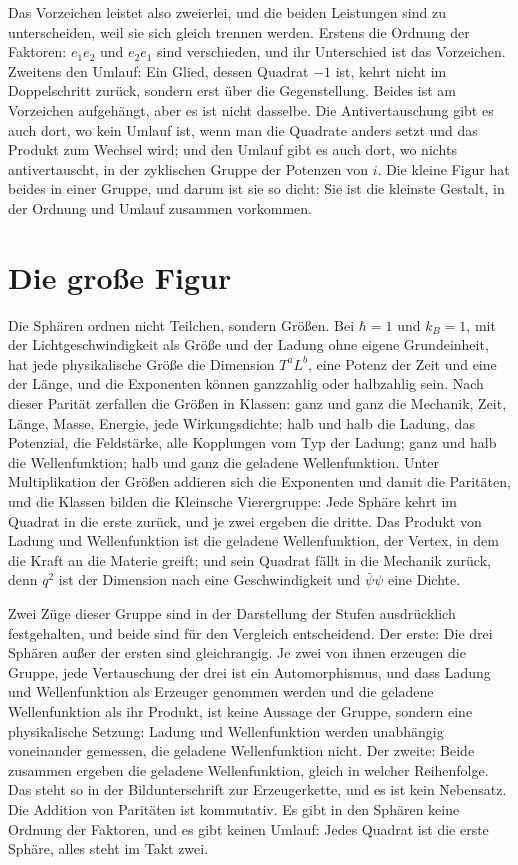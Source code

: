 \documentclass[11pt,a4paper]{article}
\begin{document}
Das Vorzeichen leistet also zweierlei, und die beiden Leistungen sind zu unterscheiden, weil sie sich gleich trennen werden. Erstens die Ordnung der Faktoren: $e_1e_2$ und $e_2e_1$ sind verschieden, und ihr Unterschied ist das Vorzeichen. Zweitens den Umlauf: Ein Glied, dessen Quadrat $-1$ ist, kehrt nicht im Doppelschritt zurück, sondern erst über die Gegenstellung. Beides ist am Vorzeichen aufgehängt, aber es ist nicht dasselbe. Die Antivertauschung gibt es auch dort, wo kein Umlauf ist, wenn man die Quadrate anders setzt und das Produkt zum Wechsel wird; und den Umlauf gibt es auch dort, wo nichts antivertauscht, in der zyklischen Gruppe der Potenzen von $i$. Die kleine Figur hat beides in einer Gruppe, und darum ist sie so dicht: Sie ist die kleinste Gestalt, in der Ordnung und Umlauf zusammen vorkommen.

\section{Die große Figur}
\label{sec:gross}

Die Sphären ordnen nicht Teilchen, sondern Größen. Bei $\hbar=1$ und $k_B=1$, mit der Lichtgeschwindigkeit als Größe und der Ladung ohne eigene Grundeinheit, hat jede physikalische Größe die Dimension $T^aL^b$, eine Potenz der Zeit und eine der Länge, und die Exponenten können ganzzahlig oder halbzahlig sein. Nach dieser Parität zerfallen die Größen in Klassen: ganz und ganz die Mechanik, Zeit, Länge, Masse, Energie, jede Wirkungsdichte; halb und halb die Ladung, das Potenzial, die Feldstärke, alle Kopplungen vom Typ der Ladung; ganz und halb die Wellenfunktion; halb und ganz die geladene Wellenfunktion. Unter Multiplikation der Größen addieren sich die Exponenten und damit die Paritäten, und die Klassen bilden die Kleinsche Vierergruppe: Jede Sphäre kehrt im Quadrat in die erste zurück, und je zwei ergeben die dritte. Das Produkt von Ladung und Wellenfunktion ist die geladene Wellenfunktion, der Vertex, in dem die Kraft an die Materie greift; und sein Quadrat fällt in die Mechanik zurück, denn $q^2$ ist der Dimension nach eine Geschwindigkeit und $\bar\psi\psi$ eine Dichte.

Zwei Züge dieser Gruppe sind in der Darstellung der Stufen ausdrücklich festgehalten, und beide sind für den Vergleich entscheidend. Der erste: Die drei Sphären außer der ersten sind gleichrangig. Je zwei von ihnen erzeugen die Gruppe, jede Vertauschung der drei ist ein Automorphismus, und dass Ladung und Wellenfunktion als Erzeuger genommen werden und die geladene Wellenfunktion als ihr Produkt, ist keine Aussage der Gruppe, sondern eine physikalische Setzung: Ladung und Wellenfunktion werden unabhängig voneinander gemessen, die geladene Wellenfunktion nicht. Der zweite: Beide zusammen ergeben die geladene Wellenfunktion, gleich in welcher Reihenfolge. Das steht so in der Bildunterschrift zur Erzeugerkette, und es ist kein Nebensatz. Die Addition von Paritäten ist kommutativ. Es gibt in den Sphären keine Ordnung der Faktoren, und es gibt keinen Umlauf: Jedes Quadrat ist die erste Sphäre, alles steht im Takt zwei.
\end{document}

